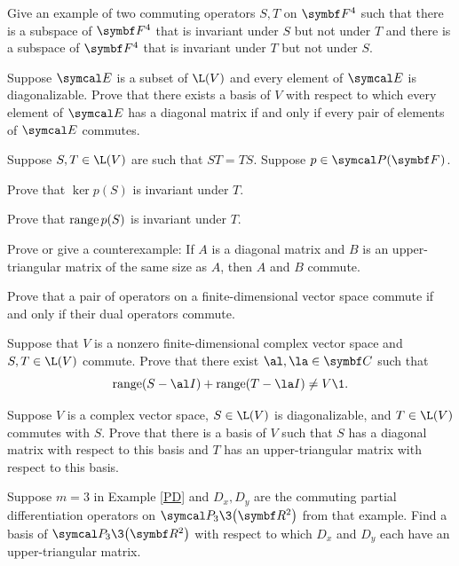 \begin{exercises}

\exercise
Give an example of two commuting operators $S, T$ on $\F4$ such that there is a subspace of $\F4$ that is invariant under $S$ but not under $T$ and there is a subspace of $\F4$ that is invariant under $T$ but not under $S$.


\exercise
Suppose $\E$ is a subset of $\L(V)$ and every element of $\E$ is diagonalizable. Prove that there exists a basis of $V$ with respect to which every element of $\E$ has a diagonal matrix if and only if every pair of elements of $\E$ commutes.%
 \label{3Diag}


\exercise
Suppose $S, T \in \L(V)$ are such that $ST = TS$. Suppose $p \in \P(\F{})$.
\begin{subtheorem}
\item
Prove that $\ker p(S)$ is invariant under $T$.
\item
Prove that $\operatorname{range} p(S)$ is invariant under $T$.
\end{subtheorem}


\exercise
Prove or give a counterexample: If $A$ is a diagonal matrix and $B$ is an upper-triangular matrix of the same size as $A$, then $A$ and $B$ commute.


\exercise
Prove that a pair of operators on a finite-dimensional vector space commute if and only if their dual operators commute.
\label{5dualcom}


\exercise
Suppose that $V$ is a nonzero finite-dimensional complex vector space and $S, T \in \L(V)$ commute. Prove that there exist $\al, \la \in \C{}$ such that
\[
\ran (S - \al I) + \ran (T - \la I) \ne V\1.
\]
\exercisedisplayend


\exercise
Suppose $V$ is a complex vector space, $S \in \L(V)$ is diagonalizable, and $T \in \L(V)$ commutes with $S$. Prove that there is a basis of $V$ such that $S$ has a diagonal matrix with respect to this basis and $T$ has an upper-triangular matrix with respect to this basis.


\exercise
Suppose $m = 3$ in Example \ref{PD} and $D_x, D_y$ are the commuting partial differentiation operators on $\P\!_3\3\paren[\big]{\R2}$ from that example. Find a basis of $\P\!_3\3\paren[\big]{\R2}$ with respect to which $D_x$ and $D_y$ each have an upper-triangular matrix.



\end{exercises}
